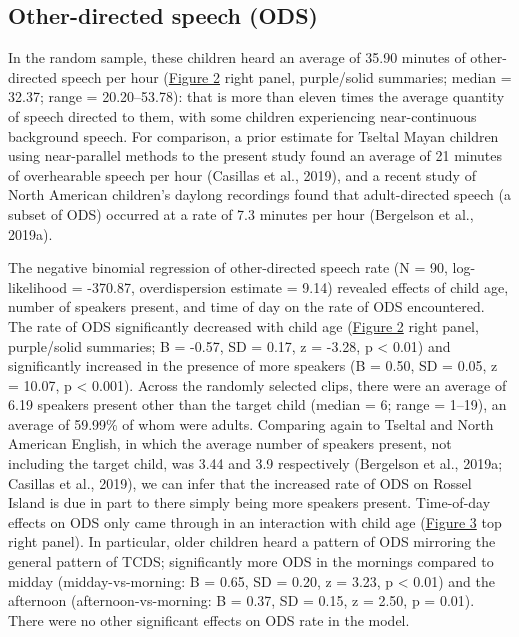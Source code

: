 \documentclass[,man,floatsintext]{apa6}
\begin{document}
\subsection{Other-directed speech
(ODS)}\label{other-directed-speech-ods}

In the random sample, these children heard an average of 35.90 minutes
of other-directed speech per hour (\protect\hyperlink{fig2}{Figure 2}
right panel, purple/solid summaries; median = 32.37; range =
20.20--53.78): that is more than eleven times the average quantity of
speech directed to them, with some children experiencing near-continuous
background speech. For comparison, a prior estimate for Tseltal Mayan
children using near-parallel methods to the present study found an
average of 21 minutes of overhearable speech per hour (Casillas et al.,
2019), and a recent study of North American children's daylong
recordings found that adult-directed speech (a subset of ODS) occurred
at a rate of 7.3 minutes per hour (Bergelson et al., 2019a).

The negative binomial regression of other-directed speech rate (N = 90,
log-likelihood = -370.87, overdispersion estimate = 9.14) revealed
effects of child age, number of speakers present, and time of day on the
rate of ODS encountered. The rate of ODS significantly decreased with
child age (\protect\hyperlink{fig2}{Figure 2} right panel, purple/solid
summaries; B = -0.57, SD = 0.17, z = -3.28, p \textless{} 0.01) and
significantly increased in the presence of more speakers (B = 0.50, SD =
0.05, z = 10.07, p \textless{} 0.001). Across the randomly selected
clips, there were an average of 6.19 speakers present other than the
target child (median = 6; range = 1--19), an average of 59.99\% of whom
were adults. Comparing again to Tseltal and North American English, in
which the average number of speakers present, not including the target
child, was 3.44 and 3.9 respectively (Bergelson et al., 2019a; Casillas
et al., 2019), we can infer that the increased rate of ODS on Rossel
Island is due in part to there simply being more speakers present.
Time-of-day effects on ODS only came through in an interaction with
child age (\protect\hyperlink{fig3}{Figure 3} top right panel). In
particular, older children heard a pattern of ODS mirroring the general
pattern of TCDS; significantly more ODS in the mornings compared to
midday (midday-vs-morning: B = 0.65, SD = 0.20, z = 3.23, p \textless{}
0.01) and the afternoon (afternoon-vs-morning: B = 0.37, SD = 0.15, z =
2.50, p = 0.01). There were no other significant effects on ODS rate in
the model.
\end{document}
